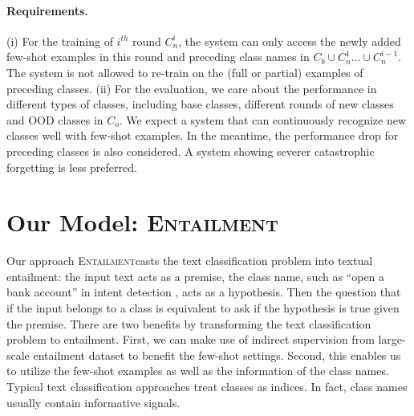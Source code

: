 \documentclass[11pt]{article}
\newcommand{\modelname}{\textsc{Entailment}}
\begin{document}
\paragraph{Requirements.}
(i) For the training of $i^{th}$ round $C_{n}^i$, the system can only access the newly added few-shot examples in this round and preceding class names in $C_b \cup C_n^{1} ... \cup  C_n^{i-1}$.
The system is not allowed to re-train on the (full or partial) examples of preceding classes.
(ii) For the evaluation, we care about the performance in different types of classes, including base classes, different rounds of new classes and OOD classes in $C_o$. We expect a system that can continuously recognize new classes well with few-shot examples. In the meantime, the performance drop for preceding classes is also considered.
A system showing severer catastrophic forgetting is less preferred.

\section{Our Model: \modelname}
Our approach \modelname\enspace casts the text classification problem into textual entailment: the input text acts as a premise, the class name, such as ``open a bank account'' in intent detection
, acts as a hypothesis. Then the question that if the input belongs to a class is equivalent to ask if the hypothesis is true given the premise. There are two benefits by transforming the text classification problem to entailment. %
First, we can make use of indirect supervision from large-scale entailment dataset \cite{williams2018broad} to benefit the few-shot settings.
Second, this enables us to utilize the few-shot examples as well as the information of the class names. Typical text classification approaches treat classes as indices. In fact, class names usually contain informative signals.
\end{document}
